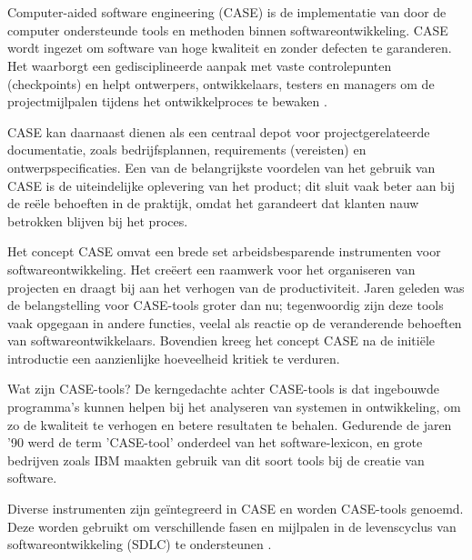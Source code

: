  \section{}%
 \label{sec:CASE}
 Computer-aided software engineering (CASE) is de implementatie van door de computer ondersteunde tools en methoden binnen softwareontwikkeling. CASE wordt ingezet om software van hoge kwaliteit en zonder defecten te garanderen. Het waarborgt een gedisciplineerde aanpak met vaste controlepunten (checkpoints) en helpt ontwerpers, ontwikkelaars, testers en managers om de projectmijlpalen tijdens het ontwikkelproces te bewaken \autocite{RahulThibodeau2024}.
 
 CASE kan daarnaast dienen als een centraal depot voor projectgerelateerde documentatie, zoals bedrijfsplannen, requirements (vereisten) en ontwerpspecificaties. Een van de belangrijkste voordelen van het gebruik van CASE is de uiteindelijke oplevering van het product; dit sluit vaak beter aan bij de reële behoeften in de praktijk, omdat het garandeert dat klanten nauw betrokken blijven bij het proces.
 
 Het concept CASE omvat een brede set arbeidsbesparende instrumenten voor softwareontwikkeling. Het creëert een raamwerk voor het organiseren van projecten en draagt bij aan het verhogen van de productiviteit. Jaren geleden was de belangstelling voor CASE-tools groter dan nu; tegenwoordig zijn deze tools vaak opgegaan in andere functies, veelal als reactie op de veranderende behoeften van softwareontwikkelaars. Bovendien kreeg het concept CASE na de initiële introductie een aanzienlijke hoeveelheid kritiek te verduren.
 
 Wat zijn CASE-tools?
 De kerngedachte achter CASE-tools is dat ingebouwde programma's kunnen helpen bij het analyseren van systemen in ontwikkeling, om zo de kwaliteit te verhogen en betere resultaten te behalen. Gedurende de jaren '90 werd de term 'CASE-tool' onderdeel van het software-lexicon, en grote bedrijven zoals IBM maakten gebruik van dit soort tools bij de creatie van software.
 
 Diverse instrumenten zijn geïntegreerd in CASE en worden CASE-tools genoemd. Deze worden gebruikt om verschillende fasen en mijlpalen in de levenscyclus van softwareontwikkeling (SDLC) te ondersteunen \autocite{RahulThibodeau2024}.
 
